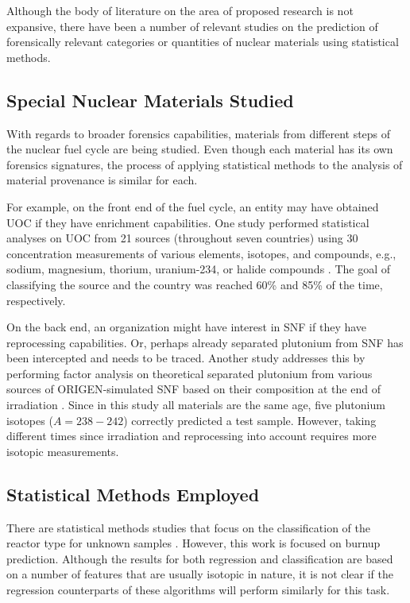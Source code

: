 Although the body of literature on the area of proposed research is not
expansive, there have been a number of relevant studies on the prediction of
forensically relevant categories or quantities of nuclear materials using
statistical methods. 

\subsection{Special Nuclear Materials Studied}

With regards to broader forensics capabilities, materials from different steps
of the nuclear fuel cycle are being studied.  Even though each material has
its own forensics signatures, the process of applying statistical methods to
the analysis of material provenance is similar for each. 

For example, on the front end of the fuel cycle, an entity may have obtained
\gls{UOC} if they have enrichment capabilities.  One study performed
statistical analyses on \gls{UOC} from 21 sources (throughout seven countries)
using 30 concentration measurements of various elements, isotopes, and
compounds, e.g., sodium, magnesium, thorium, uranium-234, or halide compounds
\cite{robel_2009}.  The goal of classifying the source and the country was
reached 60\% and 85\% of the time, respectively.  

On the back end, an organization might have interest in \gls{SNF} if they have
reprocessing capabilities.  Or, perhaps already separated plutonium from
\gls{SNF} has been intercepted and needs to be traced. Another study addresses
this by performing factor analysis on theoretical separated plutonium from
various sources of \gls{ORIGEN}-simulated \gls{SNF} based on their composition
at the end of irradiation \cite{nicolaou_pu}.  Since in this study all
materials are the same age, five plutonium isotopes ($A = 238-242$) correctly
predicted a test sample. However, taking different times since irradiation and
reprocessing into account requires more isotopic measurements. 

\subsection{Statistical Methods Employed}

There are statistical methods studies that focus on the classification of the
reactor type for unknown samples \cite{robel_2009, nicolaou_pu, jones_snf_2014,
nicolaou_2009}.  However, this work is focused on burnup prediction.  Although
the results for both regression and classification are based on a number of
features that are usually isotopic in nature, it is not clear if the regression
counterparts of these algorithms will perform similarly for this task. 

